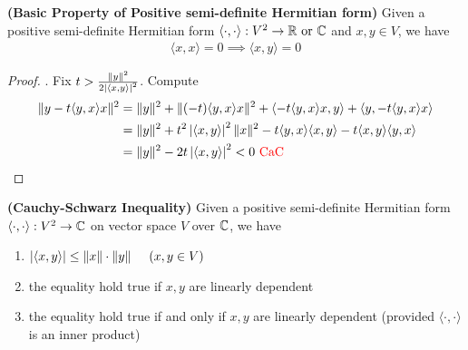 \documentclass{report}
\begin{document}
\begin{theorem}
\label{BPoP}
\textbf{(Basic Property of Positive semi-definite Hermitian form)} Given a positive semi-definite Hermitian form $\langle \cdot,\cdot\rangle:V^2 \rightarrow \mathbb{R}\text{ or }\mathbb{C} $ and $x,y \in V$, we have 
\begin{align*}
\langle x,x\rangle =0 \implies \langle x,y\rangle =0
\end{align*}
\end{theorem}
\begin{proof}
. Fix $t> \frac{\| y \|^2 }{2\left|\langle x,y\rangle \right|^2}$. Compute 
\begin{align*}
\| y-t\langle y,x\rangle x \|^2 &= \| y \|^2 + \| (-t)\langle y,x\rangle x  \|^2  + \langle -t\langle y,x\rangle x,y \rangle + \langle y,-t\langle y,x\rangle x\rangle \\
&=\| y \|^2 + t^2 \left|\langle x,y\rangle \right|^2 \| x \|^2 -t \langle y,x\rangle \langle x,y\rangle - t \langle x,y\rangle \langle y,x\rangle  \\
&= \| y \|^2- 2t \left|\langle x,y\rangle \right|^2 <0 \text{ \textcolor{red}{CaC} }
\end{align*}
\end{proof}
\begin{theorem}
\label{CSI}
\textbf{(Cauchy-Schwarz Inequality)} Given a positive semi-definite Hermitian form $\langle \cdot,\cdot\rangle :V^2\rightarrow \mathbb{C}$ on vector space $V$ over $\mathbb{C}$, we have 
\begin{enumerate}[label=(\alph*)]
  \item $\left|\langle x,y\rangle\right|\leq  \| x \|\cdot\| y \|\hspace{0.5cm}(x,y \in V)$ 
  \item the equality hold true if $x,y$ are linearly dependent
  \item the equality hold true if and only if $x,y$ are linearly dependent (provided $\langle \cdot,\cdot\rangle $ is an inner product)
\end{enumerate}
\end{theorem}
\end{document}
